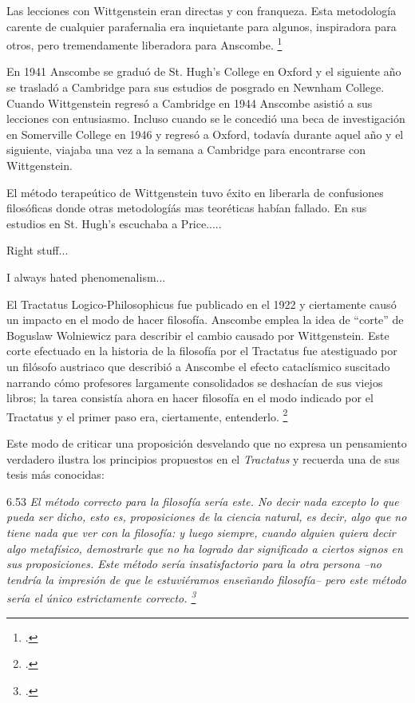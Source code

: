 Las lecciones con Wittgenstein eran directas y con franqueza. Esta metodología carente de cualquier parafernalia era inquietante para algunos, inspiradora para otros, pero tremendamente liberadora para Anscombe. \footcite[loc 9853 Chapter 4, Section 24, para. 5]{monk}

En 1941 Anscombe se graduó de St. Hugh's College en Oxford y el siguiente año se trasladó a Cambridge para sus estudios de posgrado en Newnham College. Cuando Wittgenstein regresó a Cambridge en 1944 Anscombe asistió a sus lecciones con entusiasmo. Incluso cuando se le concedió una beca de investigación en Somerville College en 1946 y regresó a Oxford, todavía durante aquel año y el siguiente, viajaba una vez a la semana a Cambridge para encontrarse con Wittgenstein.  

El método terapeútico de Wittgenstein tuvo éxito en liberarla de confusiones filosóficas donde otras metodologíás mas teoréticas habían fallado. En sus estudios en St. Hugh's escuchaba a Price.....

Right stuff...

I always hated phenomenalism...


El Tractatus Logico-Philosophicus fue publicado en el 1922 y ciertamente causó un impacto en el modo de hacer filosofía. Anscombe emplea la idea de ``corte'' de Boguslaw Wolniewicz para describir el cambio causado por Wittgenstein. Este corte efectuado en la historia de la filosofía por el Tractatus fue atestiguado por un filósofo austriaco que describió a Anscombe el efecto cataclísmico suscitado narrando cómo profesores largamente consolidados se deshacían de sus viejos libros; la tarea consistía ahora en hacer filosofía en el modo indicado por el Tractatus y el primer paso era, ciertamente, entenderlo. \footcite[p.181]{twocuts} 

Este modo de criticar una proposición desvelando que no expresa un pensamiento verdadero ilustra los principios propuestos en el \emph{Tractatus} y recuerda una de sus tesis más conocidas: 

6.53 \emph{El método correcto para la filosofía sería este. No decir nada excepto lo que pueda ser dicho, esto es, proposiciones de la ciencia natural, es decir, algo que no tiene nada que ver con la filosofía: y luego siempre, cuando alguien quiera decir algo metafísico, demostrarle que no ha logrado dar significado a ciertos signos en sus proposiciones. Este método sería insatisfactorio para la otra persona --no tendría la impresión de que le estuviéramos enseñando filosofía-- pero este método sería el único estrictamente correcto. \footcite[p. 107--108]{tractatus}}



